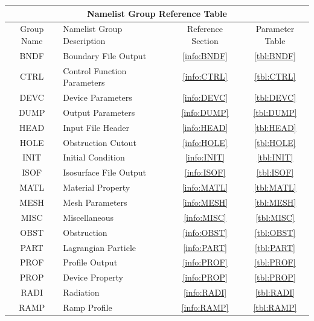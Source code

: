 \documentclass[11pt]{book}
\begin{document}
\vspace{\baselineskip}
\begin{table}[ht]
\small
\begin{center}
\begin{tabular}{|c|l|c|c|}
\hline
\multicolumn{4}{|c|}{Namelist Group Reference Table} \\ \hline \hline
Group Name  & Namelist Group Description& Reference Section & Parameter Table  \\ \hline
{\ct BNDF}  & Boundary File Output         & \ref{info:BNDF} & \ref{tbl:BNDF}  \\ \hline
{\ct CTRL}  & Control Function Parameters  & \ref{info:CTRL} & \ref{tbl:CTRL}  \\ \hline
{\ct DEVC}  & Device Parameters            & \ref{info:DEVC} & \ref{tbl:DEVC}  \\ \hline
{\ct DUMP}  & Output Parameters            & \ref{info:DUMP} & \ref{tbl:DUMP}  \\ \hline
{\ct HEAD}  & Input File Header            & \ref{info:HEAD} & \ref{tbl:HEAD}  \\ \hline
{\ct HOLE}  & Obstruction Cutout           & \ref{info:HOLE} & \ref{tbl:HOLE}  \\ \hline
{\ct INIT}  & Initial Condition            & \ref{info:INIT} & \ref{tbl:INIT}  \\ \hline
{\ct ISOF}  & Isosurface File Output       & \ref{info:ISOF} & \ref{tbl:ISOF}  \\ \hline
{\ct MATL}  & Material Property            & \ref{info:MATL} & \ref{tbl:MATL}  \\ \hline
{\ct MESH}  & Mesh Parameters              & \ref{info:MESH} & \ref{tbl:MESH}  \\ \hline
{\ct MISC}  & Miscellaneous                & \ref{info:MISC} & \ref{tbl:MISC}  \\ \hline
{\ct OBST}  & Obstruction                  & \ref{info:OBST} & \ref{tbl:OBST}  \\ \hline
{\ct PART}  & Lagrangian Particle          & \ref{info:PART} & \ref{tbl:PART}  \\ \hline
{\ct PROF}  & Profile Output               & \ref{info:PROF} & \ref{tbl:PROF}  \\ \hline
{\ct PROP}  & Device Property              & \ref{info:PROP} & \ref{tbl:PROP}  \\ \hline
{\ct RADI}  & Radiation                    & \ref{info:RADI} & \ref{tbl:RADI}  \\ \hline
{\ct RAMP}  & Ramp Profile                 & \ref{info:RAMP} & \ref{tbl:RAMP}  \\ \hline

\end{tabular}
\end{center}
\end{table}
\end{document}
